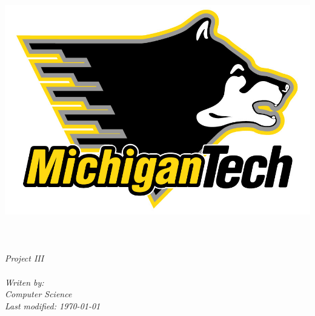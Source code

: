 \documentclass[11pt, a4paper, oneside]{Thesis}
\begin{document}
\begin{titlepage}
\begin{center}

\includegraphics{logo.jpg}\\[1cm] %
\textsc{\LARGE \univname}\\[1.5cm] %
\HRule \\[1.0cm] %
{\huge \bfseries \ttitle}\\[0.4cm] %

\huge \textit {Project III}\\[0.1cm] %
\HRule \\[1.5cm] %

\small \textit{Writen by: \authornames}\\[0.5cm] %
\textit{Computer Science}\\[2cm] %
\textit{\large Last modified: \today}\\[4cm] %

 
\vfill
\end{center}

\end{titlepage}


\clearpage %


\pagestyle{empty} %
\end{document}
